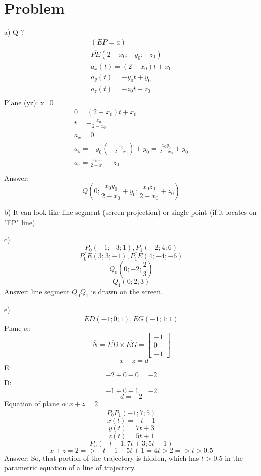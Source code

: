 \documentclass[11pt]{article}
\begin{document}
    \section{Problem}
    a) Q-? \newline
    \begin{gather*}
        (EP=a)\\
        \overline{PE}(2-x_0;-y_0;-z_0)\\
        a_x(t)=(2-x_0)t+x_0\\
        a_y(t)=-y_0t+y_0\\
        a_z(t)=-z_0t+z_0\\
    \end{gather*}
    Plane (yz): x=0 \newline
    \begin{gather*}
        0=(2-x_0)t+x_0\\
        t=-\frac{x_0}{2-x_0}\\
        a_x=0\\
        a_y=-y_0(-\frac{x_0}{2-x_0})+y_0=\frac{x_0y_0}{2-x_0}+y_0\\
        a_z=\frac{x_0z_0}{2-x_0}+z_0\\
    \end{gather*}
    Answer: \[Q (0; \frac{x_0y_0}{2-x_0}+y_0; \frac{x_0z_0}{2-x_0}+z_0)\]

    b) It can look like line segment (screen projection) or single point (if it locates on "EP" line).

    c) \[P_0(-1;-3;1), P_1(-2;4;6)\]
    \[\overline{P_0E}(3;3;-1), \overline{P_1E}(4;-4;-6)\]
    \[Q_0(0;-2;\frac{2}{3})\]
    \[Q_1(0;2;3)\]
    Answer: line segment \(Q_0 Q_1\) is drawn on the screen.

    e) \[\overline{ED}(-1;0;1), \overline{EG}(-1;1;1)\]
    Plane \(\alpha\):
    \[\overline{N}=\overline{ED}\times\overline{EG}= \begin{bmatrix}
                                                     -1 \\
                                                      0 \\
                                                     -1
                                                     \end{bmatrix} \]
    \[-x-z=d\]
    E: \[-2+0-0=-2\]
    D: \[-1+0-1=-2\]
    \[d=-2\]
    Equation of plane \(\alpha: x+z=2\)
    \[\overline{P_0P_1}(-1;7;5)\]
    \[x(t)=-t-1\]
    \[y(t)=7t+3\]
    \[z(t)=5t+1\]
    \[P_n(-t-1; 7t+3; 5t+1)\]
    \[x+z=2 => -t-1+5t+1=4t>2 => t>0.5\]
    Answer: So, that portion of the trajectory is hidden, which has \(t>0.5\) in the parametric equation of a line of trajectory.
\end{document}
